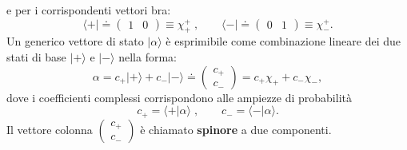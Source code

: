 e per i corrispondenti vettori bra:
\begin{equation}
\langle + \vert \doteq \begin{pmatrix}
1 & 0
\end{pmatrix} \equiv \chi_{+}^{+} \; , \qquad \langle - \vert \doteq \begin{pmatrix}
0 & 1
\end{pmatrix} \equiv \chi_{-}^{+} .
\end{equation}
Un generico vettore di stato $\vert \alpha \rangle$ è esprimibile come combinazione lineare dei due stati di base $\vert + \rangle$ e $\vert - \rangle$ nella forma:
\begin{equation}
\alpha = c_{+}\vert + \rangle + c_{-}\vert - \rangle\doteq \begin{pmatrix}
c_{+}\\
c_{-}
\end{pmatrix}= c_{+}\chi_{+}+c_{-}\chi_{-} ,
\end{equation}
dove i coefficienti complessi corrispondono alle ampiezze di probabilità
\[
c_{+}=\langle + \vert \alpha \rangle \; , \qquad c_{-}=\langle - \vert \alpha \rangle .
\]
Il vettore colonna $\begin{pmatrix}
c_{+}\\
c_{-}
\end{pmatrix}$ è chiamato \textbf{spinore} a due componenti.